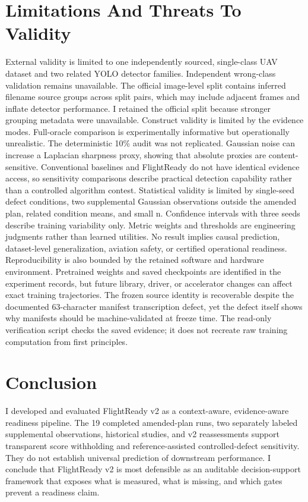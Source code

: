 \documentclass[conference]{IEEEtran}
\begin{document}
\section{Limitations And Threats To Validity}
External validity is limited to one independently sourced, single-class UAV dataset and two related YOLO detector families. Independent wrong-class validation remains unavailable. The official image-level split contains inferred filename source groups across split pairs, which may include adjacent frames and inflate detector performance. I retained the official split because stronger grouping metadata were unavailable.
Construct validity is limited by the evidence modes. Full-oracle comparison is experimentally informative but operationally unrealistic. The deterministic 10\% audit was not replicated. Gaussian noise can increase a Laplacian sharpness proxy, showing that absolute proxies are content-sensitive. Conventional baselines and FlightReady do not have identical evidence access, so sensitivity comparisons describe practical detection capability rather than a controlled algorithm contest.
Statistical validity is limited by single-seed defect conditions, two supplemental Gaussian observations outside the amended plan, related condition means, and small n. Confidence intervals with three seeds describe training variability only. Metric weights and thresholds are engineering judgments rather than learned utilities. No result implies causal prediction, dataset-level generalization, aviation safety, or certified operational readiness.
Reproducibility is also bounded by the retained software and hardware environment. Pretrained weights and saved checkpoints are identified in the experiment records, but future library, driver, or accelerator changes can affect exact training trajectories. The frozen source identity is recoverable despite the documented 63-character manifest transcription defect, yet the defect itself shows why manifests should be machine-validated at freeze time. The read-only verification script checks the saved evidence; it does not recreate raw training computation from first principles.
\section{Conclusion}
I developed and evaluated FlightReady v2 as a context-aware, evidence-aware readiness pipeline. The 19 completed amended-plan runs, two separately labeled supplemental observations, historical studies, and v2 reassessments support transparent score withholding and reference-assisted controlled-defect sensitivity. They do not establish universal prediction of downstream performance. I conclude that FlightReady v2 is most defensible as an auditable decision-support framework that exposes what is measured, what is missing, and which gates prevent a readiness claim.
\end{document}
